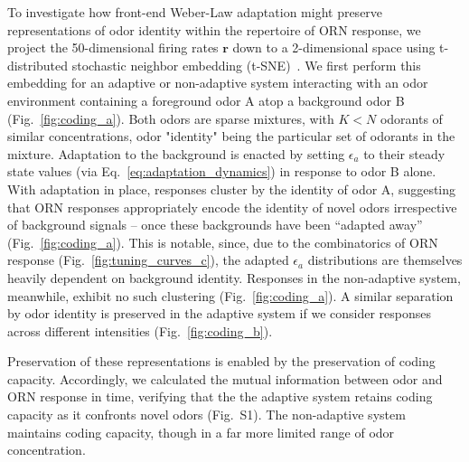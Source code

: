 \documentclass[10pt,prl,aps,showpacs,twocolumn,unsortedaddress]{revtex4-1}
\begin{document}
To investigate how front-end Weber-Law adaptation might preserve representations of odor identity within the repertoire of ORN response, we project the 50-dimensional  firing rates $\mathbf r$ down to a 2-dimensional space using t-distributed stochastic neighbor embedding (t-SNE)~\cite{tsne}. We first perform this embedding for an adaptive or non-adaptive system interacting with an odor environment containing a foreground odor A atop a background odor B (Fig.~\ref{fig:coding_a}). Both odors are sparse mixtures, with $K < N$ odorants of similar concentrations, odor "identity" being the particular set of odorants in the mixture. Adaptation to the background is enacted by setting $\epsilon_a$ to their steady state values (via Eq.~\ref{eq:adaptation_dynamics}) in response to odor B alone. With adaptation in place, responses cluster by the identity of odor A, suggesting that ORN responses appropriately encode the identity of novel odors irrespective of background signals -- once these backgrounds have been ``adapted away'' (Fig.~\ref{fig:coding_a}). This is notable, since, due to the combinatorics of ORN response (Fig.~\ref{fig:tuning_curves_c}), the adapted $\epsilon_a$ distributions are themselves heavily dependent on background identity. Responses in the non-adaptive system, meanwhile, exhibit no such clustering (Fig.~\ref{fig:coding_a}).
A similar separation by odor identity is preserved in the adaptive system if we consider responses across different intensities (Fig.~\ref{fig:coding_b}). 

Preservation of these representations is enabled by the preservation of coding capacity. Accordingly, we calculated the mutual information between odor and ORN response in time, verifying that the the adaptive system retains coding capacity as it confronts novel odors (Fig.~S1). The non-adaptive system maintains coding capacity, though in a far more limited range of odor concentration.

\end{document}
